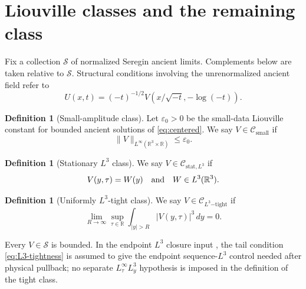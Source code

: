 \documentclass[11pt]{amsart}
\theoremstyle{plain}
\theoremstyle{definition}
\newtheorem{definition}[theorem]{Definition}
\theoremstyle{remark}
\numberwithin{equation}{section}
\newcommand{\R}{\mathbb R}
\newcommand{\calS}{\mathcal S}
\newcommand{\calC}{\mathcal C}
\begin{document}
\section{Liouville classes and the remaining class}\label{sec:classes}

Fix a collection \(\calS\) of normalized Seregin ancient limits.  Complements
below are taken relative to \(\calS\).  Structural conditions involving the
unrenormalized ancient field refer to
\[
   U(x,t)=(-t)^{-1/2}V(x/\sqrt{-t},-\log(-t)).
\]

\begin{definition}[Small-amplitude class]\label{def:small-class}
Let \(\varepsilon_0>0\) be the small-data Liouville constant for bounded
ancient solutions of \eqref{eq:centered}.  We say
\(V\in\calC_{\mathrm{small}}\) if
\[
   \|V\|_{L^\infty(\R^3\times\R)}\le \varepsilon_0.
\]
\end{definition}

\begin{definition}[Stationary \(L^3\) class]\label{def:stationary-class}
We say \(V\in\calC_{\mathrm{stat},L^3}\) if
\[
   V(y,\tau)=W(y)
   \quad\hbox{and}\quad
   W\in L^3(\R^3).
\]
\end{definition}

\begin{definition}[Uniformly \(L^3\)-tight class]\label{def:tight-class}
We say \(V\in\calC_{L^3\mathrm{-tight}}\) if
\begin{equation}\label{eq:L3-tightness}
   \lim_{R\to\infty}
   \sup_{\tau\in\R}\int_{|y|>R}|V(y,\tau)|^3\,dy=0 .
\end{equation}
\end{definition}

Every \(V\in\calS\) is bounded.  In the endpoint \(L^3\) closure input
, the tail condition \eqref{eq:L3-tightness} is
assumed to give the endpoint sequence-\(L^3\) control needed after physical
pullback; no separate \(L^\infty_\tau L^3_y\) hypothesis is imposed in the
definition of the tight class.
\end{document}
